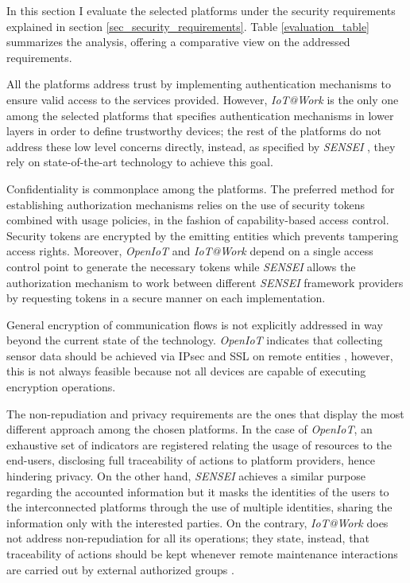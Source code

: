\documentclass[journal]{IEEEtran}
\begin{document}
  In this section I evaluate the selected platforms under the security requirements explained in section \ref{sec_security_requirements}. Table \ref{evaluation_table} summarizes the analysis, offering a comparative view on the addressed requirements. 
  
  All the platforms address trust by implementing authentication mechanisms to ensure valid access to the services provided. However, \emph{IoT@Work} is the only one among the selected platforms that specifies authentication mechanisms in lower layers in order to define trustworthy devices; the rest of the platforms do not address these low level concerns directly, instead, as specified by \emph{SENSEI} \cite{Bauge2010}, they rely on state-of-the-art technology to achieve this goal.

  Confidentiality is commonplace among the platforms. The preferred method for establishing authorization mechanisms relies on the use of security tokens combined with usage policies, in the fashion of capability-based access control. Security tokens are encrypted by the emitting entities which prevents tampering access rights. Moreover, \emph{OpenIoT} and \emph{IoT@Work} depend on a single access control point to generate the necessary tokens while \emph{SENSEI} allows the authorization mechanism to work between different \emph{SENSEI} framework providers by requesting tokens in a secure manner on each implementation.

  General encryption of communication flows is not explicitly addressed in way beyond the current state of the technology. \emph{OpenIoT} indicates that collecting sensor data should be achieved via IPsec and SSL on remote entities \cite{Dimitropoulus2012}, however, this is not always feasible because not all devices are capable of executing encryption operations.

  The non-repudiation and privacy requirements are the ones that display the most different approach among the chosen platforms. In the case of \emph{OpenIoT}, an exhaustive set of indicators are registered relating the usage of resources to the end-users, disclosing full traceability of actions to platform providers, hence hindering privacy. On the other hand, \emph{SENSEI} achieves a similar purpose regarding the accounted information but it masks the identities of the users to the interconnected platforms through the use of multiple identities, sharing the information only with the interested parties. On the contrary, \emph{IoT@Work} does not address non-repudiation for all its operations; they state, instead, that traceability of actions should be kept whenever remote maintenance interactions are carried out by external authorized groups \cite{Huth2010}.
  
\end{document}
